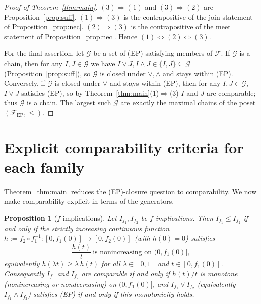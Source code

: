 \documentclass{amsart}
\theoremstyle{plain}
\newtheorem{proposition}{Proposition}
\theoremstyle{definition}
\newcommand{\Fcal}{\mathcal{F}}
\begin{document}
\begin{proof}[Proof of Theorem~\ref{thm:main}]
$(3)\Rightarrow(1)$ and $(3)\Rightarrow(2)$ are Proposition~\ref{prop:suff}.
$(1)\Rightarrow(3)$ is the contrapositive of the join statement of
Proposition~\ref{prop:nec}. $(2)\Rightarrow(3)$ is the contrapositive of the meet
statement of Proposition~\ref{prop:nec}. Hence $(1)\Leftrightarrow(2)\Leftrightarrow(3)$.

For the final assertion, let $\mathcal{G}$ be a set of (EP)-satisfying members of $\Fcal$.
If $\mathcal{G}$ is a chain, then for any $I,J\in\mathcal{G}$ we have $I\vee J,I\wedge J\in
\{I,J\}\subseteq\mathcal{G}$ (Proposition~\ref{prop:suff}), so $\mathcal{G}$ is closed
under $\vee,\wedge$ and stays within (EP). Conversely, if $\mathcal{G}$ is closed under
$\vee$ and stays within (EP), then for any $I,J\in\mathcal{G}$, $I\vee J$ satisfies (EP),
so by Theorem~\ref{thm:main}(1)$\Rightarrow$(3) $I$ and $J$ are comparable; thus
$\mathcal{G}$ is a chain. The largest such $\mathcal{G}$ are exactly the maximal chains of
the poset $(\Fcal_{\mathrm{EP}},\le)$.
\end{proof}

\section{Explicit comparability criteria for each family}\label{sec:explicit}

Theorem~\ref{thm:main} reduces the (EP)-closure question to comparability. We now make
comparability explicit in terms of the generators.

\begin{proposition}[$f$-implications]\label{prop:f}
Let $I_{f_1},I_{f_2}$ be $f$-implications. Then $I_{f_1}\le I_{f_2}$ if and only if the
strictly increasing continuous function $h:=f_2\circ f_1^{-1}\colon[0,f_1(0)]\to[0,f_2(0)]$
(with $h(0)=0$) satisfies
\begin{equation}\label{eq:hmono}
\frac{h(t)}{t}\ \text{is nonincreasing on }(0,f_1(0)],
\end{equation}
equivalently $h(\lambda t)\ge\lambda\,h(t)$ for all $\lambda\in[0,1]$ and
$t\in[0,f_1(0)]$. Consequently $I_{f_1}$ and $I_{f_2}$ are comparable if and only if
$h(t)/t$ is monotone (nonincreasing or nondecreasing) on $(0,f_1(0)]$, and
$I_{f_1}\vee I_{f_2}$ (equivalently $I_{f_1}\wedge I_{f_2}$) satisfies \textup{(EP)} if and
only if this monotonicity holds.
\end{proposition}
\end{document}
